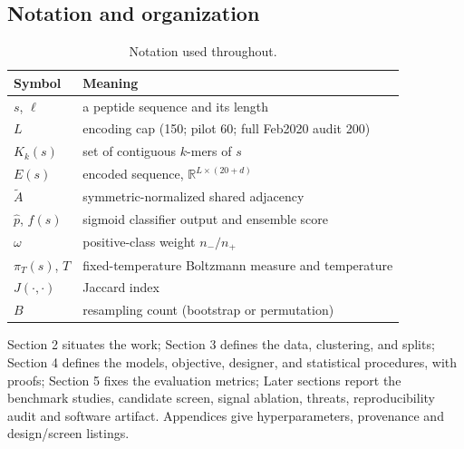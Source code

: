 \subsection{Notation and organization}
\begin{table}[h]\centering\caption{Notation used throughout.}
\begin{tabular}{ll}\hline
Symbol & Meaning \\ \hline
$s$, $\ell$ & a peptide sequence and its length \\
$L$ & encoding cap (150; pilot 60; full Feb2020 audit 200) \\
$K_k(s)$ & set of contiguous $k$-mers of $s$ \\
$E(s)$ & encoded sequence, $\mathbb{R}^{L\times(20+d)}$ \\
$\tilde A$ & symmetric-normalized shared adjacency \\
$\hat p$, $f(s)$ & sigmoid classifier output and ensemble score \\
$\omega$ & positive-class weight $n_-/n_+$ \\
$\pi_T(s)$, $T$ & fixed-temperature Boltzmann measure and temperature \\
$J(\cdot,\cdot)$ & Jaccard index \\
$B$ & resampling count (bootstrap or permutation) \\
\hline\end{tabular}\end{table}

Section 2 situates the work; Section 3 defines the data, clustering, and
splits; Section 4 defines the models, objective, designer, and statistical
procedures, with proofs; Section 5 fixes the evaluation metrics; Later sections report the benchmark studies, candidate screen, signal
ablation, threats, reproducibility audit and software artifact. Appendices
give hyperparameters, provenance and design/screen listings.

